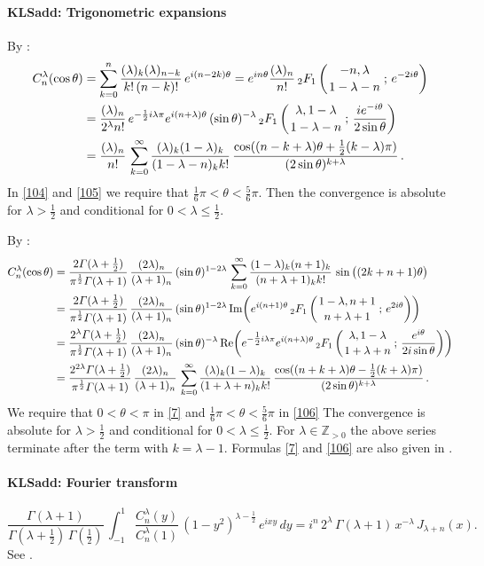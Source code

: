 \documentclass[envcountchap,graybox]{svmono}
\newcommand{\hyp}[5]{\mbox{}_{#1}{F}_{#2}
\left(\genfrac{}{}{0pt}{}{#3}{#4}\,;\,#5\right)}
\renewcommand{\Gamma}{\varGamma}
\newcommand\ZZ{\mathbb{Z}}
\newcommand\tha\theta
\newcommand\la\lambda
\newcommand\Ga{\Gamma}
\newcommand\half{\frac12}
\newcommand\thalf{\tfrac12}
\newcommand\iy\infty
\newcommand\Zpos{\ZZ_{>0}}
\newcommand{\hyp}[5]{\,\mbox{}_{#1}F_{#2}\!\left(
  \genfrac{}{}{0pt}{}{#3}{#4};#5\right)}
\renewcommand\Re{{\rm Re}\,}
\renewcommand\Im{{\rm Im}\,}
\begin{document}
\paragraph{\large\bf KLSadd: Trigonometric expansions}By :
\begin{align}
C_n^{\la}(\cos\tha)
&=\sum_{k=0}^n\frac{(\la)_k(\la)_{n-k}}{k!\,(n-k)!}\,e^{i(n-2k)\tha}
=e^{in\tha}\frac{(\la)_n}{n!}\,
\hyp21{-n,\la}{1-\la-n}{e^{-2i\tha}}\label{103}\\
&=\frac{(\la)_n}{2^\la n!}\,
e^{-\half i\la\pi}e^{i(n+\la)\tha}\,(\sin\tha)^{-\la}\,
\hyp21{\la,1-\la}{1-\la-n}{\frac{i e^{-i\tha}}{2\sin\tha}}\label{104}\\
&=\frac{(\la)_n}{n!}\,\sum_{k=0}^\iy\frac{(\la)_k(1-\la)_k}{(1-\la-n)_k k!}\,
\frac{\cos((n-k+\la)\tha+\thalf(k-\la)\pi)}{(2\sin\tha)^{k+\la}}\,.\label{105}
\end{align}
In \eqref{104} and \eqref{105} we require that
$\tfrac16\pi<\tha<\tfrac56\pi$. Then the convergence is absolute for $\la>\thalf$
and conditional for $0<\la\le\thalf$.

By \mycite{DLMF}{(14.13.1), (14.3.21), (15.8.1)]}:
\begin{align}
C_n^\la(\cos\tha)&=\frac{2\Ga(\la+\thalf)}{\pi^\half\Ga(\la+1)}\,
\frac{(2\la)_n}{(\la+1)_n}\,(\sin\tha)^{1-2\la}\,
\sum_{k=0}^\iy\frac{(1-\la)_k(n+1)_k}{(n+\la+1)_k k!}\,
\sin\big((2k+n+1)\tha\big)
\label{7}\\
&=\frac{2\Ga(\la+\thalf)}{\pi^\half\Ga(\la+1)}\,
\frac{(2\la)_n}{(\la+1)_n}\,(\sin\tha)^{1-2\la}\,
\Im\!\!\left(e^{i(n+1)\tha}\,\hyp21{1-\la,n+1}{n+\la+1}{e^{2i\tha}}\right)\nonumber\\
&=\frac{2^\la\Ga(\la+\thalf)}{\pi^\half\Ga(\la+1)}\,
\frac{(2\la)_n}{(\la+1)_n}\,(\sin\tha)^{-\la}\,
\Re\!\!\left(e^{-\thalf i\la\pi}e^{i(n+\la)\tha}\,
\hyp21{\la,1-\la}{1+\la+n}{\frac{e^{i\tha}}{2i\sin\tha}}\right)\nonumber\\
&=\frac{2^{2\la}\Ga(\la+\thalf)}{\pi^\half\Ga(\la+1)}\,\frac{(2\la)_n}{(\la+1)_n}\,
\sum_{k=0}^\iy\frac{(\la)_k(1-\la)_k}{(1+\la+n)_k k!}\,
\frac{\cos((n+k+\la)\tha-\thalf(k+\la)\pi)}{(2\sin\tha)^{k+\la}}\,.
\label{106}
\end{align}
We require that $0<\tha<\pi$ in \eqref{7} and $\tfrac16\pi<\tha<\tfrac56\pi$ in
\eqref{106} The convergence is absolute for $\la>\thalf$ and conditional for
$0<\la\le\thalf$.
For $\la\in\Zpos$ the above series terminate after the term with
$k=\la-1$.
Formulas \eqref{7} and \eqref{106} are also given in
.
%
\paragraph{\large\bf KLSadd: Fourier transform}\begin{equation}
\frac{\Ga(\la+1)}{\Ga(\la+\thalf)\,\Ga(\thalf)}\,
\int_{-1}^1 \frac{C_n^\la(y)}{C_n^\la(1)}\,(1-y^2)^{\la-\half}\,
e^{ixy}\,dy
=i^n\,2^\la\,\Ga(\la+1)\,x^{-\la}\,J_{\la+n}(x).
\label{8}
\end{equation}
See .
%
\end{document}
